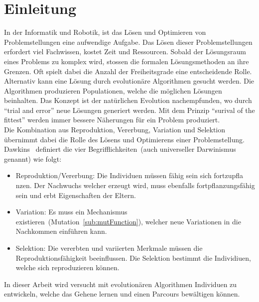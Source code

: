 %
%


\chapter{Einleitung}

  In der Informatik und Robotik, ist das Lösen und Optimieren von Problemstellungen eine aufwendige Aufgabe.
  Das Lösen dieser Problemstellungen erfordert viel Fachwissen, kostet Zeit und Ressourcen.
  Sobald der Lösungsraum eines Problems zu komplex wird, stossen die formalen Lösungsmethoden an ihre Grenzen.
  Oft spielt dabei die Anzahl der Freiheitsgrade eine entscheidende Rolle.
  \\
  Alternativ kann eine Lösung durch evolutionäre Algorithmen gesucht werden.
  Die Algorithmen produzieren Populationen, welche die möglichen Lösungen beinhalten.
  Das Konzept ist der natürlichen Evolution nachempfunden, wo durch ``trial and error'' neue Lösungen generiert werden.
  Mit dem Prinzip ``surival of the fittest'' werden immer bessere Näherungen für ein Problem produziert.
  \\
  Die Kombination aus Reproduktion, Vererbung, Variation und Selektion
  übernimmt dabei die Rolle des Lösens und Optimierens einer Problemstellung.
  \\
  Dawkins~\cite{book:universalDarwinism} definiert die vier Begrifflichkeiten~(auch universeller Darwinismus genannt) wie folgt:

  \begin{itemize}

    \item Reproduktion/Vererbung: Die Individuen müssen fähig sein sich fortzupfla nzen.
      Der Nachwuchs welcher erzeugt wird, muss ebenfalls fortpflanzungsfähig sein und erbt Eigenschaften der Eltern.

    \item Variation: Es muss ein Mechanismus existieren~(Mutation~\vref{sub:mutFunction}),
      welcher neue Variationen in die Nachkommen einführen kann.

    \item Selektion: Die vererbten und variierten Merkmale müssen die Reproduktionsfähigkeit beeinflussen.
      Die Selektion bestimmt die Individiuen, welche sich reproduzieren können.

  \end{itemize}

  In dieser Arbeit wird versucht mit evolutionären Algorithmen Individuen zu entwickeln,
  welche das Gehene lernen und einen Parcours bewältigen können.

